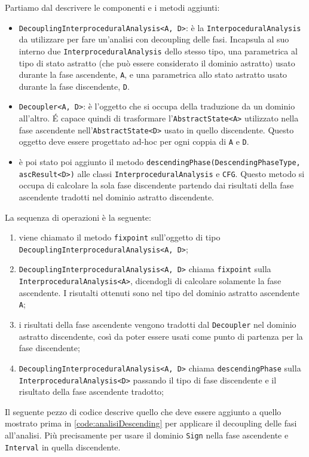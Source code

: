Partiamo dal descrivere le componenti e i metodi aggiunti:
\begin{itemize}
\itemsep0pt
    \item \texttt{DecouplingInterproceduralAnalysis<A, D>}: è la \texttt{InterpoceduralAnalysis} da utilizzare per fare un'analisi con decoupling delle fasi. Incapsula al suo interno due \texttt{InterproceduralAnalysis} dello stesso tipo, una parametrica al tipo di stato astratto (che può essere considerato il dominio astratto) usato durante la fase ascendente, \texttt{A}, e una parametrica allo stato astratto usato durante la fase discendente, \texttt{D}. 
    \item \texttt{Decoupler<A, D>}: è l'oggetto che si occupa della traduzione da un dominio all'altro. \'E capace quindi di trasformare l'\texttt{AbstractState<A>} utilizzato nella fase ascendente nell'\texttt{AbstractState<D>} usato in quello discendente. Questo oggetto deve essere progettato ad-hoc per ogni coppia di \texttt{A} e \texttt{D}. 
    \item è poi stato poi aggiunto il metodo \texttt{descendingPhase(DescendingPhaseType, ascResult<D>)} alle classi \texttt{InterproceduralAnalysis} e \texttt{CFG}. Questo metodo si occupa di calcolare la sola fase discendente partendo dai risultati della fase ascendente tradotti nel dominio astratto discendente.
\end{itemize}
La sequenza di operazioni è la seguente:
\begin{enumerate}
\itemsep0pt
    \item viene chiamato il metodo \texttt{fixpoint} sull'oggetto di tipo \texttt{DecouplingInterproceduralAnalysis<A, D>};
    \item \texttt{DecouplingInterproceduralAnalysis<A, D>} chiama \texttt{fixpoint} sulla \texttt{InterproceduralAnalysis<A>}, dicendogli di calcolare solamente la fase ascendente. I risutalti ottenuti sono nel tipo del dominio astratto ascendente \texttt{A};
    \item i risultati della fase ascendente vengono tradotti dal \texttt{Decoupler} nel dominio astratto discendente, così da poter essere usati come punto di partenza per la fase discendente;
    \item \texttt{DecouplingInterproceduralAnalysis<A, D>} chiama \texttt{descendingPhase} sulla \texttt{InterproceduralAnalysis<D>} passando il tipo di fase discendente e il risultato della fase ascendente tradotto;
\end{enumerate}
Il seguente pezzo di codice descrive quello che deve essere aggiunto a quello mostrato prima in \ref{code:analisiDescending} per applicare il decoupling delle fasi all'analisi. Più precisamente per usare il dominio \texttt{Sign} nella fase ascendente e \texttt{Interval} in quella discendente. 
